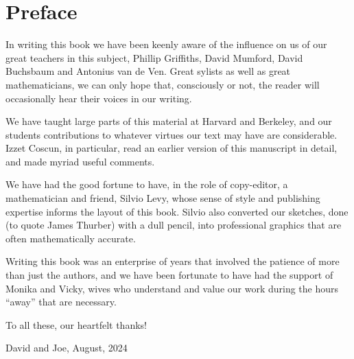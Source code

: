 

\chapter*{Preface}
\label{preface}


In writing this book we have been keenly aware of  the influence on us of 
our great teachers in this subject,
Phillip Griffiths, David Mumford, David Buchsbaum and Antonius van de Ven. Great sylists
as well as great mathematicians, we can only hope that, consciously or not, the reader will occasionally hear their voices in our writing. 

We have  taught large parts of this material
at Harvard and Berkeley, and our students contributions to whatever virtues our text may have
are considerable. Izzet Coscun, in particular, read an earlier version of this manuscript in detail, and made myriad useful comments. 

We have had the good fortune to have, in the
role of copy-editor, a mathematician and friend, Silvio Levy, whose sense of style and publishing expertise informs the
layout of this book. Silvio also converted our sketches, done (to quote James Thurber) with a dull
pencil, into professional graphics that are often mathematically accurate.

Writing this book was an enterprise of years that involved the patience of more than just the authors, and we have been fortunate to have had the support of Monika and Vicky, wives who understand and value our work during the hours ``away'' that are necessary.

To all these, our heartfelt thanks!

David and Joe, August, 2024

